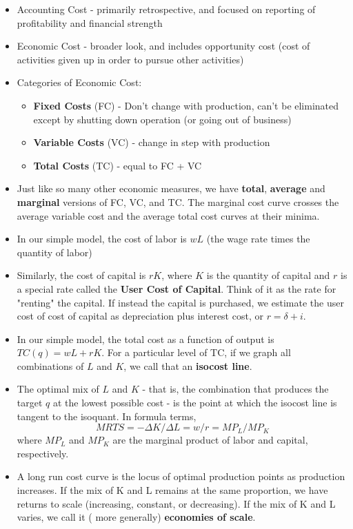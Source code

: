 \documentclass{exam}
\begin{document}
\begin{itemize}
  \item Accounting Cost - primarily retrospective, and focused on reporting of profitability and financial strength
  \item Economic Cost - broader look, and includes opportunity cost (cost of activities given up in order to pursue other activities)
  \item Categories of Economic Cost:
    \begin{itemize}
      \item \textbf{Fixed Costs} (FC) - Don't change with production, can't be eliminated except by shutting down operation (or going out of business)
      \item \textbf{Variable Costs} (VC) - change in step with production
      \item \textbf{Total Costs} (TC) - equal to FC + VC

    \end{itemize}
  \item Just like so many other economic measures, we have \textbf{total}, \textbf{average} and \textbf{marginal} versions
    of FC, VC, and TC.  The marginal cost curve crosses the average variable cost and
    the average total cost curves at their minima.
  \item In our simple model, the cost of labor is $wL$ (the wage rate times the quantity of labor)
  \item Similarly, the cost of capital is $rK$, where $K$ is the quantity of capital and $r$ is a special rate called the \textbf{User
    Cost of Capital}.  Think of it as the rate for "renting" the capital.  If instead the capital is purchased, we estimate the user cost of
    cost of capital as depreciation plus interest cost, or $r = \delta + i$.
  \item In our simple model, the total cost as a function of output is $TC(q) = wL + rK$.  For a particular level of TC,
    if we graph all combinations of $L$ and $K$, we call that an \textbf{isocost line}.
  \item The optimal mix of $L$ and $K$ - that is, the combination that produces the target $q$ at the lowest possible cost - is the point
    at which the isocost line is tangent to the isoquant.  In formula terms,
    $$MRTS = -\Delta K / \Delta L = w / r = MP_L / MP_K$$
    where $MP_L$ and $MP_K$ are the marginal product of labor and capital, respectively.
  \item A long run cost curve is the locus of optimal production points as production increases.  If the mix of K and L remains at
    the same proportion, we have returns to scale (increasing, constant, or decreasing).  If the mix of K and L varies, we call it (
    more generally) \textbf{economies of scale}.

\end{itemize}
\end{document}
